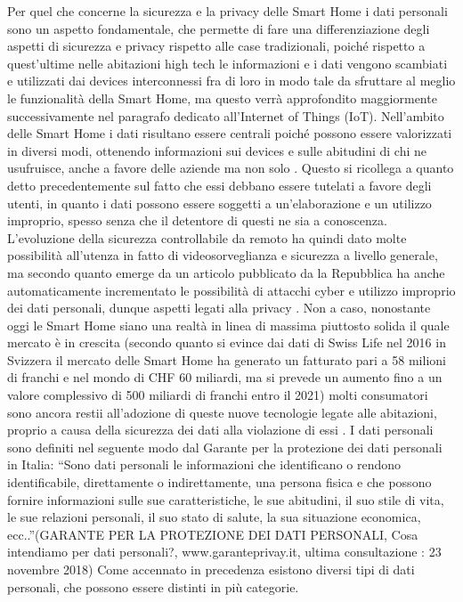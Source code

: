 Per quel che concerne la sicurezza e la privacy delle Smart Home i dati personali sono un aspetto fondamentale, che permette di fare una differenziazione degli aspetti di sicurezza e privacy rispetto alle case tradizionali, poiché rispetto a quest’ultime nelle abitazioni high tech le informazioni e i dati vengono scambiati e utilizzati dai devices interconnessi fra di loro in modo tale da sfruttare al meglio le funzionalità della Smart Home, ma questo verrà approfondito maggiormente successivamente nel paragrafo dedicato all’Internet of Things (IoT). Nell’ambito delle Smart Home i dati risultano essere centrali poiché possono essere valorizzati in diversi modi, ottenendo informazioni sui devices e sulle abitudini di chi ne usufruisce, anche a favore delle aziende ma non solo . Questo si ricollega a quanto detto precedentemente sul fatto che essi debbano essere tutelati a favore degli utenti, in quanto i dati possono essere soggetti a un’elaborazione e un utilizzo improprio, spesso senza che il detentore di questi ne sia a conoscenza. L’evoluzione della sicurezza controllabile da remoto ha quindi dato molte possibilità all’utenza in fatto di videosorveglianza e sicurezza a livello generale, ma secondo quanto emerge da un articolo pubblicato da la Repubblica ha anche automaticamente incrementato le possibilità di attacchi cyber e utilizzo improprio dei dati personali, dunque aspetti legati alla privacy . Non a caso, nonostante oggi le Smart Home siano una realtà in linea di massima piuttosto solida il quale mercato è in crescita (secondo quanto si evince dai dati di Swiss Life nel 2016 in Svizzera il mercato delle Smart Home ha generato un fatturato pari a 58 milioni di franchi e nel mondo di CHF 60 miliardi, ma si prevede un aumento fino a un valore complessivo di 500 miliardi di franchi entro il 2021)  molti consumatori sono ancora restii all’adozione di queste nuove tecnologie legate alle abitazioni, proprio a causa della sicurezza dei dati alla violazione di essi .
I dati personali sono definiti nel seguente modo dal Garante per la protezione dei dati personali in Italia: 
“Sono dati personali le informazioni che identificano o rendono identificabile, direttamente o indirettamente, una persona fisica e che possono fornire informazioni sulle sue caratteristiche, le sue abitudini, il suo stile di vita, le sue relazioni personali, il suo stato di salute, la sua situazione economica, ecc..”(GARANTE PER LA PROTEZIONE DEI DATI PERSONALI, Cosa intendiamo per dati personali?, www.garanteprivay.it, ultima consultazione : 23 novembre 2018) 
Come accennato in precedenza esistono diversi tipi di dati personali, che possono essere distinti in più categorie.

